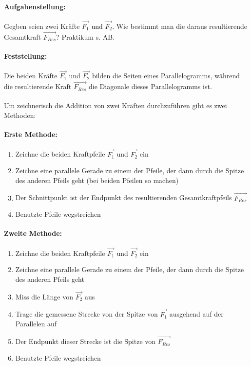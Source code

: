 \documentclass[12pt]{article}
\numberwithin{equation}{subsection}
\begin{document}
	\paragraph{Aufgabenstellung:}
	Gegben seien zwei Kräfte $ \vec{F_1} $ und $ \vec{F_2} $. Wie bestimmt man die daraus resultierende Gesamtkraft $ \vec{F_{Res}} $? Praktikum s. AB.
	\paragraph{Feststellung:}
	Die beiden Kräfte $ \vec{F_1} $ und $ \vec{F_2} $ bilden die Seiten eines Parallelogramms, während die resultierende Kraft $ \vec{F_{Res}} $ die Diagonale dieses Parallelogramms ist.\\\\
	Um zeichnerisch die Addition von zwei Kräften durchzuführen gibt es zwei Methoden:
	\paragraph{Erste Methode:}
	\begin{enumerate}
		\item Zeichne die beiden Kraftpfeile $ \vec{F_1} $ und $ \vec{F_2} $ ein
		\item Zeichne eine parallele Gerade zu einem der Pfeile, der dann durch die Spitze des anderen Pfeils geht (bei beiden Pfeilen so machen)
		\item Der Schnittpunkt ist der Endpunkt des resultierenden Gesamtkraftpfeils $ \vec{F_{Res}} $
		\item Benutzte Pfeile wegstreichen
	\end{enumerate}
	\paragraph{Zweite Methode:}
	\begin{enumerate}
		\item Zeichne die beiden Kraftpfeile $ \vec{F_1} $ und $ \vec{F_2} $ ein
		\item Zeichne eine parallele Gerade zu einem der Pfeile, der dann durch die Spitze des anderen Pfeils geht
		\item Miss die Länge von $ \vec{F_2} $ aus
		\item Trage die gemessene Strecke von der Spitze von $ \vec{F_1} $ ausgehend auf der Parallelen auf
		\item Der Endpunkt dieser Strecke ist die Spitze von $ \vec{F_{Res}} $
		\item Benutzte Pfeile wegstreichen
	\end{enumerate}
	
\end{document}
